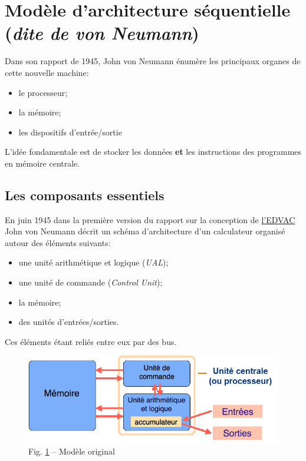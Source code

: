 \documentclass[11pt,french]{article}
\makeatletter
\def\maxwidth{\ifdim\Gin@nat@width>\linewidth\linewidth
    \else\Gin@nat@width\fi}
\let\Oldincludegraphics\includegraphics
\renewcommand{\includegraphics}[1]{\Oldincludegraphics[width=.8\maxwidth]{#1}}
\makeatother
\begin{document}
    \hypertarget{moduxe8le-darchitecture-suxe9quentielle-dite-de-von-neumann}{%
\section{\texorpdfstring{Modèle d'architecture séquentielle (\emph{dite
de von
Neumann})}{Modèle d'architecture séquentielle (dite de von Neumann)}}\label{moduxe8le-darchitecture-suxe9quentielle-dite-de-von-neumann}}

Dans son rapport de 1945, John von Neumann énumère les principaux
organes de cette nouvelle machine:
\begin{itemize}
\item le processeur; 
\item la mémoire; 
\item les dispositifs d'entrée/sortie
\end{itemize}

L'idée fondamentale est de stocker les données \textbf{et} les
instructions des programmes en mémoire centrale.

\hypertarget{les-composants-essentiels}{%
\subsection{Les composants essentiels}\label{les-composants-essentiels}}

En juin 1945 dans la première version du rapport sur la conception de
\href{https://fr.wikipedia.org/wiki/Electronic_Discrete_Variable_Automatic_Computer}{l'EDVAC}
John von Neumann décrit un schéma d'architecture d'un calculateur
organisé autour des éléments suivants:
\begin{itemize}
\item une unité arithmétique et logique (\emph{UAL}); 
\item une unité de commande (\emph{Control Unit}); 
\item la mémoire; 
\item des unités d'entrées/sorties.
\end{itemize}
Ces éléments étant reliés entre eux par des bus.

\begin{figure}[h]
	\begin{center}
		\includegraphics{../img/modele-originel2.png}
	\end{center}
	\caption{Fig. \ref{fig:modeloriginal} -- Modèle original}
	\label{fig:modeloriginal}
\end{figure}
\end{document}
